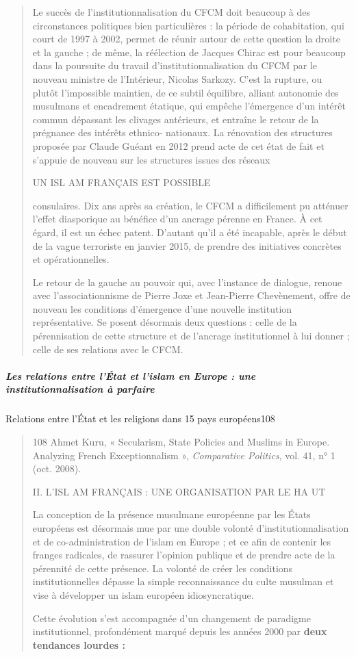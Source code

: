 \begin{quote}
Le succès de l'institutionnalisation du CFCM doit beaucoup à des
circonstances politiques bien particulières : la période de
cohabitation, qui court de 1997 à 2002, permet de réunir autour de cette
question la droite et la gauche ; de même, la réélection de Jacques
Chirac est pour beaucoup dans la poursuite du travail
d'institutionnalisation du CFCM par le nouveau ministre de l'Intérieur,
Nicolas Sarkozy. C'est la rupture, ou plutôt l'impossible maintien, de
ce subtil équilibre, alliant autonomie des musulmans et encadrement
étatique, qui empêche l'émergence d'un intérêt commun dépassant les
clivages antérieurs, et entraîne le retour de la prégnance des intérêts
ethnico- nationaux. La rénovation des structures proposée par Claude
Guéant en 2012 prend acte de cet état de fait et s'appuie de nouveau sur
les structures issues des réseaux

UN ISL AM FRANÇAIS EST POSSIBLE

consulaires. Dix ans après sa création, le CFCM a difficilement pu
atténuer l'effet diasporique au bénéfice d'un ancrage pérenne en France.
À cet égard, il est un échec patent. D'autant qu'il a été incapable,
après le début de la vague terroriste en janvier 2015, de prendre des
initiatives concrètes et opérationnelles.

Le retour de la gauche au pouvoir qui, avec l'instance de dialogue,
renoue avec l'associationnisme de Pierre Joxe et Jean-Pierre
Chevènement, offre de nouveau les conditions d'émergence d'une nouvelle
institution représentative. Se posent désormais deux questions : celle
de la pérennisation de cette structure et de l'ancrage institutionnel à
lui donner ; celle de ses relations avec le CFCM.
\end{quote}

\hypertarget{les-relations-entre-luxe9tat-et-lislam-en-europe-une-institutionnalisation-uxe0-parfaire}{%
\subparagraph{Les relations entre l'État et l'islam en Europe : une
institutionnalisation à
parfaire}\label{les-relations-entre-luxe9tat-et-lislam-en-europe-une-institutionnalisation-uxe0-parfaire}}

Relations entre l'État et les religions dans 15 pays européens108

\begin{quote}
108 Ahmet Kuru, « Secularism, State Policies and Muslims in Europe.
Analyzing French Exceptionnalism », \emph{Comparative Politics}, vol.
41, n° 1 (oct. 2008).

II. L'ISL AM FRANÇAIS : UNE ORGANISATION PAR LE HA UT

La conception de la présence musulmane européenne par les États
européens est désormais mue par une double volonté
d'institutionnalisation et de co-administration de l'islam en Europe ;
et ce afin de contenir les franges radicales, de rassurer l'opinion
publique et de prendre acte de la pérennité de cette présence. La
volonté de créer les conditions institutionnelles dépasse la simple
reconnaissance du culte musulman et vise à développer un islam européen
idiosyncratique.

Cette évolution s'est accompagnée d'un changement de paradigme
institutionnel, profondément marqué depuis les années 2000 par
\textbf{deux tendances lourdes :}
\end{quote}

